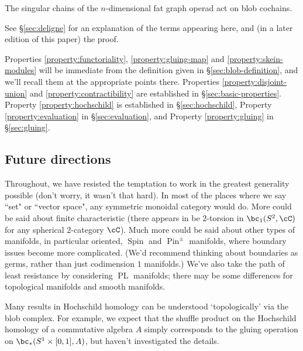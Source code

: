 \begin{property}
\label{property:deligne}
The singular chains of the $n$-dimensional fat graph operad act on blob cochains.
\end{property}
See \S \ref{sec:deligne} for an explanation of the terms appearing here, and (in a later edition of this paper) the proof.


Properties \ref{property:functoriality}, \ref{property:gluing-map} and \ref{property:skein-modules} will be immediate from the definition given in
\S \ref{sec:blob-definition}, and we'll recall them at the appropriate points there. 
Properties \ref{property:disjoint-union} and \ref{property:contractibility} are established in \S \ref{sec:basic-properties}.
Property \ref{property:hochschild} is established in \S \ref{sec:hochschild}, Property \ref{property:evaluation} in \S \ref{sec:evaluation},
and Property \ref{property:gluing} in \S \ref{sec:gluing}.

\subsection{Future directions}
\label{sec:future}
Throughout, we have resisted the temptation to work in the greatest generality possible (don't worry, it wasn't that hard). 
In most of the places where we say ``set" or ``vector space", any symmetric monoidal category would do.
More could be said about finite characteristic (there appears in be $2$-torsion in $\bc_1(S^2, \cC)$ for any spherical $2$-category $\cC$). Much more could be said about other types of manifolds, in particular oriented, $\operatorname{Spin}$ and $\operatorname{Pin}^{\pm}$ manifolds, where boundary issues become more complicated. (We'd recommend thinking about boundaries as germs, rather than just codimension $1$ manifolds.) We've also take the path of least resistance by considering $\operatorname{PL}$ manifolds; there may be some differences for topological manifolds and smooth manifolds.

Many results in Hochschild homology can be understood `topologically' via the blob complex. For example, we expect that the shuffle product on the Hochschild homology of a commutative algebra $A$ simply corresponds to the gluing operation on $\bc_*(S^1 \times [0,1], A)$, but haven't investigated the details.

